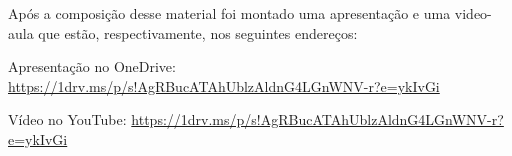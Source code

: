 Após a composição desse material foi montado uma apresentação e uma video-aula que estão, respectivamente, nos seguintes endereços:

Apresentação no OneDrive: \url{https://1drv.ms/p/s!AgRBucATAhUblzAldnG4LGnWNV-r?e=ykIvGi} \\
\begin{center}
\end{center}




Vídeo no YouTube: \url{https://1drv.ms/p/s!AgRBucATAhUblzAldnG4LGnWNV-r?e=ykIvGi} \\
\begin{center}
\end{center}
